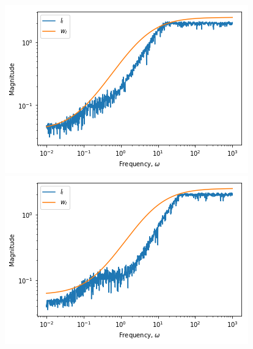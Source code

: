 \begin{figure}[H]
	\centering
	\begin{minipage}{.48\textwidth}
		\centering
		\includegraphics[width=\linewidth]{Figures/Uncertainty_wI_13}
	\end{minipage}%
	\hfill
	\begin{minipage}{.48\textwidth}
		\centering
		\includegraphics[width=\linewidth]{Figures/Uncertainty_wI_21}
	\end{minipage}
\end{figure}

